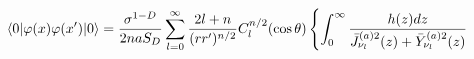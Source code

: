 \begin{equation}
\langle 0|\varphi (x)\varphi (x^{\prime })|0\rangle =\frac{\sigma ^{1-D}}{%
2naS_{D}}\sum_{l=0}^{\infty }\frac{2l+n}{(rr^{\prime })^{n/2}}%
C_{l}^{n/2}(\cos \theta )\left\{ \int_{0}^{\infty }\frac{h(z)dz}{\bar{J}%
_{\nu _{l}}^{(a)2}(z)+\bar{Y}_{\nu _{l}}^{(a)2}(z)}\right.
\label{unregWightab}
\end{equation}

